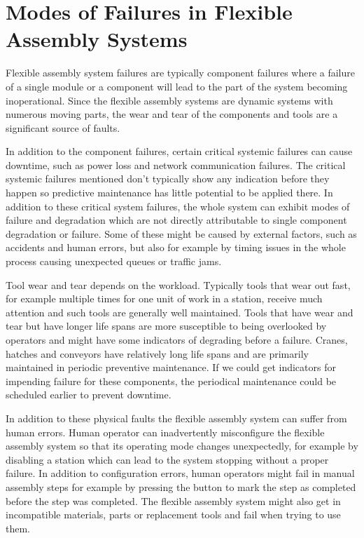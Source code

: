 \documentclass[procedia]{easychair}
\begin{document}
\section{Modes of Failures in Flexible Assembly Systems}

Flexible assembly system failures are typically component failures where a failure of a single module or a component will lead to the part of the system becoming inoperational.
Since the flexible assembly systems are dynamic systems with numerous moving parts, the wear and tear of the components and tools are a significant source of faults.

In addition to the component failures, certain critical systemic failures can cause downtime, such as power loss and network communication failures.
The critical systemic failures mentioned don't typically show any indication before they happen so predictive maintenance has little potential to be applied there.
In addition to these critical system failures,
the whole system can exhibit modes of failure and degradation which are not directly attributable to single component degradation or failure.
Some of these might be caused by
external factors, such as accidents and human errors, but also for example by timing issues in the whole process causing unexpected queues or traffic jams.

Tool wear and tear depends on the workload. Typically tools that wear out fast, for example multiple times for one unit of work in a station, receive much attention and such tools are generally
well maintained. Tools that have wear and tear but have longer life spans are more susceptible to being overlooked by operators and might have some indicators of degrading
before a failure. Cranes, hatches and conveyors have relatively long life spans and are primarily maintained in periodic preventive maintenance. If we could get indicators
for impending failure for these components, the periodical maintenance could be scheduled earlier to prevent downtime.

In addition to these physical faults the flexible
assembly system can suffer from human errors. Human operator can inadvertently misconfigure the flexible assembly system so that its operating mode changes unexpectedly,
for example by disabling a station which can lead to the system stopping without a proper failure. In addition to configuration
errors, human operators might fail in manual assembly steps for example by pressing the button to mark the step
as completed before the step was completed.
The flexible assembly system might also get in incompatible materials, parts or replacement tools and fail when trying to use them.
\end{document}
